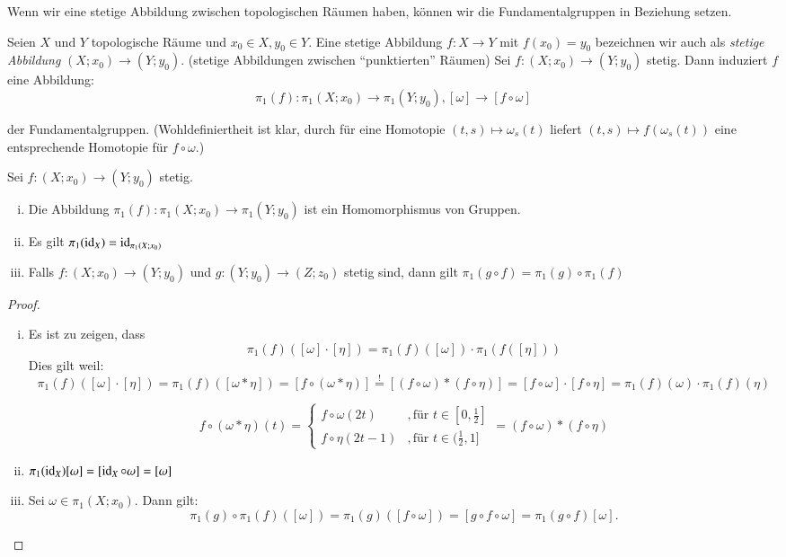 \documentclass[a4paper,10pt]{scrartcl}
\begin{document}
Wenn wir eine stetige Abbildung zwischen topologischen Räumen haben, können wir die Fundamentalgruppen in Beziehung setzen.
\begin{df}
 Seien $X$ und $Y$ topologische Räume und $x_0\in X, y_0 \in Y$. Eine stetige Abbildung $f: X\to Y$ mit $f(x_0)=y_0$ bezeichnen wir auch als \emph{stetige Abbildung} $(X;x_0)\to (Y;y_0)$. (stetige Abbildungen zwischen "`punktierten"' Räumen) Sei $f: (X;x_0) \to (Y;y_0)$ stetig.  Dann induziert $f$ eine Abbildung:
\[
 \pi_1 (f) : \pi_1(X;x_0)\to \pi_1(Y;y_0), [\omega] \to [f \circ \omega]
\]
\begin{figure}[ht]
\centering

\caption{}
\end{figure}
der Fundamentalgruppen. (Wohldefiniertheit ist klar, durch für eine Homotopie $(t,s)\mapsto \omega_s(t)$ liefert $(t,s) \mapsto f(\omega_s(t))$ eine entsprechende Homotopie für $f\circ \omega$.)
\end{df}
\begin{st}
 Sei $f: (X;x_0)\to (Y;y_0)$ stetig.
\begin{enumerate}[(i)]
 \item Die Abbildung $\pi_1(f): \pi_1(X;x_0) \to \pi_1(Y;y_0)$ ist ein Homomorphismus von Gruppen.
 \item Es gilt $\pi_1(\operatorname{id}_X)=\operatorname{id}_{\pi_1(X; x_0)}$
 \item Falls $f:(X;x_0) \to (Y;y_0)$ und $g: (Y; y_0) \to (Z; z_0)$ stetig sind, dann gilt $\pi_1(g\circ f)=\pi_1(g)\circ \pi_1(f)$
\end{enumerate}
\end{st}
\begin{proof}
\begin{enumerate}[(i)]
\item Es ist zu zeigen, dass
\[
 \pi_1(f)([\omega]\cdot [\eta])=\pi_1(f)([\omega])\cdot \pi_1(f([\eta]))
\]
Dies gilt weil: 
$$
\pi_1(f)([\omega]\cdot [\eta])=\pi_1(f)([\omega*\eta])= [f\circ (\omega*\eta)] \stackrel ! = [(f\circ \omega)*(f\circ \eta)]=[f\circ \omega] \cdot [f\circ \eta]=\pi_1(f)(\omega)\cdot \pi_1(f)(\eta)
$$

\[
 f\circ(\omega*\eta)(t)=\begin{cases} f\circ \omega (2t) &, \text{für } t\in[0,\frac{1}{2}]\\  f\circ \eta (2t - 1) &, \text{für } t\in(\frac{1}{2},1]\end{cases} = (f \circ \omega) * (f \circ \eta)
\]
\item $\pi_1(\operatorname{id}_X)[\omega]=[\operatorname{id}_X\circ \omega]=[\omega]$
\item Sei $\omega\in \pi_1(X;x_0)$. Dann gilt:
\[
 \pi_1(g)\circ \pi_1(f)([\omega])=\pi_1(g)([f\circ \omega])=[g\circ f \circ \omega]=\pi_1(g\circ f) [\omega].
\]
\end{enumerate}
\end{proof}
\end{document}
